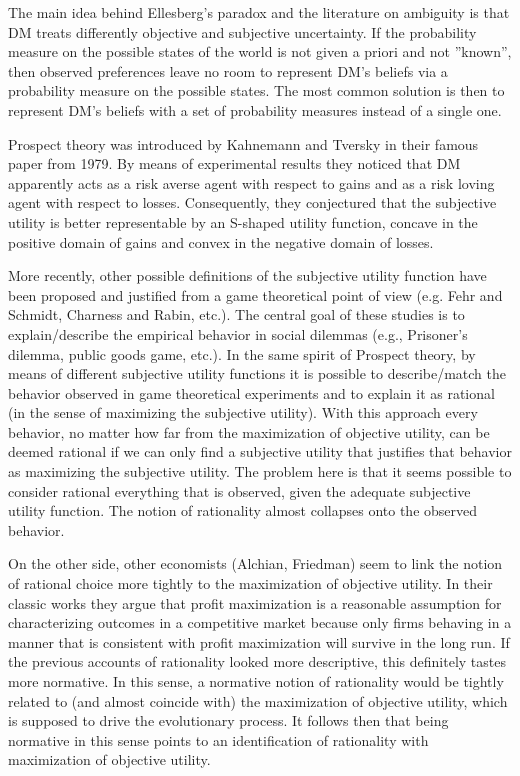 \documentclass[fleqn,reqno,11pt]{article}
\begin{document}
The main idea behind Ellesberg's paradox and the literature on ambiguity is that DM treats differently objective and subjective uncertainty. If the probability measure on the possible states of the world is not given a priori and not ''known'', then observed preferences leave no room to represent  DM's beliefs via a probability measure on the possible states. The most common solution is then to represent DM's beliefs with a set of probability measures instead of a single one.  

Prospect theory was introduced by Kahnemann and Tversky in
their famous paper from 1979. By means of experimental results they noticed that DM apparently acts as a risk averse agent with respect to gains and as a risk loving agent
with respect to losses. Consequently, they conjectured that the subjective utility is better
representable by an S-shaped utility function, concave in the positive domain of gains and
convex in the negative domain of losses.

More recently, other possible definitions of the subjective utility function have been proposed
and justified from a game theoretical point of view (e.g. Fehr and Schmidt, Charness and Rabin,
etc.). The central goal of these studies is to explain/describe the empirical behavior in social dilemmas
(e.g., Prisoner's dilemma, public goods game, etc.). In the same spirit of Prospect theory, by means of different subjective utility
functions it is possible to describe/match the behavior observed in game theoretical experiments and to
explain it as rational (in the sense of maximizing the subjective utility).
With this approach every behavior, no matter how far from the maximization of
objective utility, can be deemed rational if we can only find a subjective utility that
justifies that behavior as maximizing the subjective utility. The problem here is that it seems possible to consider rational everything
that is observed, given the adequate subjective utility function. The notion
of rationality almost collapses onto the observed behavior.

On the other side, other economists (Alchian, Friedman) seem to link the notion of rational choice
more tightly to the maximization of objective utility. In their classic works they argue that
profit maximization is a reasonable assumption for characterizing outcomes in a competitive
market because only firms behaving in a manner that is consistent with profit maximization will
survive in the long run. If the previous accounts of rationality looked more descriptive, this
definitely tastes more normative. In this sense, a normative notion of rationality would be tightly
related to (and almost coincide with) the maximization of objective utility, which is supposed
to drive the evolutionary process. It follows then that being normative in this sense points to an identification of rationality with maximization of objective utility.
\end{document}
